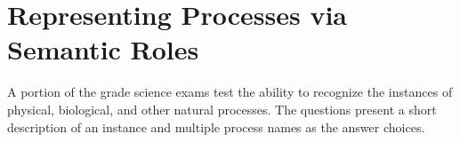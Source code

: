 \section{Representing Processes via Semantic Roles}

A portion of the grade science exams test the ability to recognize the instances of physical, biological, and other natural processes. 
The questions present a short description of an instance and multiple process names as the answer choices. 



